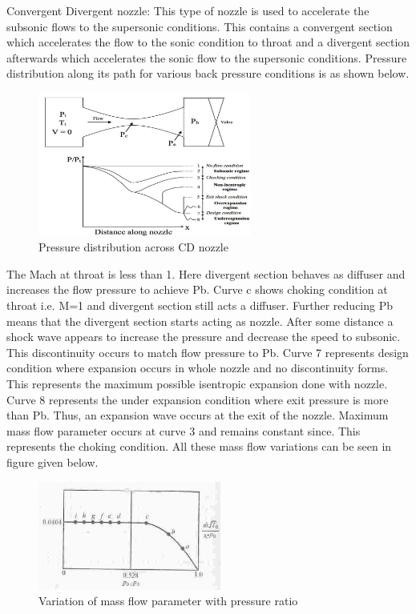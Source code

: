 {\Large Convergent Divergent nozzle:}
This type of nozzle is used to accelerate the subsonic flows to the supersonic
conditions. This contains a convergent section which accelerates the flow to the
sonic condition to throat and a divergent section afterwards which accelerates the sonic flow to the supersonic conditions. Pressure distribution along its path for various back pressure conditions is as shown below.
\begin{figure}[!h]
    \centering
    \includegraphics[width=7cm]{CD pressure distribution.jpg}
    \caption{Pressure distribution across CD nozzle}
\end{figure}
\newline
The Mach at throat is less than 1. Here divergent section behaves as diffuser
and increases the flow pressure to achieve Pb. Curve c shows choking condition at
throat i.e. M=1 and divergent section still acts a diffuser.
\newline
Further reducing Pb
means that the divergent section starts acting as nozzle. After some distance a
shock wave appears to increase the pressure and decrease the speed to subsonic.
This discontinuity occurs to match flow pressure to Pb. 
\newline
Curve 7 represents design
condition where expansion occurs in whole nozzle and no discontinuity forms.
This represents the maximum possible isentropic expansion done with nozzle.
\newline
Curve 8 represents the under expansion condition where exit pressure is more
than Pb. Thus, an expansion wave occurs at the exit of the nozzle.
Maximum mass flow parameter occurs at curve 3 and remains constant since. This represents the choking condition.
\newpage
All these mass flow variations can be seen in figure given below.
\begin{figure}[!h]
    \centering
    \includegraphics[width=6cm]{CD mass flow.jpg}
    \caption{Variation of mass flow parameter with pressure ratio}
\end{figure}
